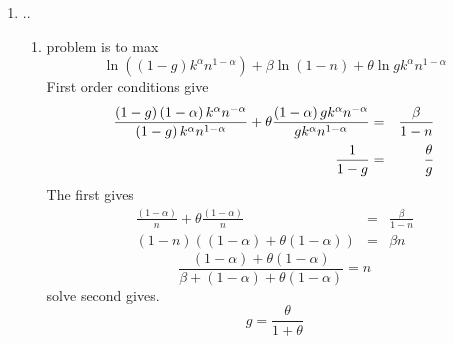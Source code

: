 \documentclass{article}
\begin{document}
\begin{enumerate}
\begin{enumerate}
\begin{enumerate}
\item Use market clearing conditions to find\ 
\begin{equation*}
\frac{\left( 1-\alpha \right) \left( \frac{k}{n}\right) ^{\alpha }}{%
k^{\alpha }n^{1-\alpha }-G}=\frac{\beta }{1-n}
\end{equation*}%
but $G=gy$ so we get 
\begin{equation*}
\frac{\left( 1-\alpha \right) k_{0}^{\alpha }n^{-\alpha }}{\left( 1-g\right)
k_{0}^{\alpha }n^{1-\alpha }}=\frac{\beta }{1-n}
\end{equation*}%
and simplifying gives 
\begin{equation*}
\frac{\left( 1-\alpha \right) }{\left( 1-g\right) n}=\frac{\beta }{1-n}
\end{equation*}%
or 
\begin{equation*}
\frac{\left( 1-\alpha \right) }{1+\beta \left( 1-g\right) -\alpha }=n
\end{equation*}
\end{enumerate}

\item ..

\begin{enumerate}
\item problem is to max%
\begin{equation*}
\ln (\left( 1-g\right) k^{\alpha }n^{1-\alpha })+\beta \ln \left( 1-n\right)
+\theta \ln gk^{\alpha }n^{1-\alpha }
\end{equation*}%
First order conditions give 
\begin{eqnarray*}
\frac{\left( 1-g\right) \left( 1-\alpha \right) k^{\alpha }n^{-\alpha }}{%
\left( 1-g\right) k^{\alpha }n^{1-\alpha }}+\theta \frac{\left( 1-\alpha
\right) gk^{\alpha }n^{-\alpha }}{gk^{\alpha }n^{1-\alpha }} &=&\frac{\beta 
}{1-n} \\
\frac{1}{1-g} &=&\frac{\theta }{g}
\end{eqnarray*}%
The first gives%
\begin{eqnarray*}
\frac{\left( 1-\alpha \right) }{n}+\theta \frac{\left( 1-\alpha \right) }{n}
&=&\frac{\beta }{1-n} \\
\left( 1-n\right) \left( \left( 1-\alpha \right) +\theta \left( 1-\alpha
\right) \right) &=&\beta n
\end{eqnarray*}%
\begin{equation*}
\frac{\left( 1-\alpha \right) +\theta \left( 1-\alpha \right) }{\beta
+\left( 1-\alpha \right) +\theta \left( 1-\alpha \right) }=n
\end{equation*}%
solve second gives$.$ 
\begin{equation*}
g=\frac{\theta }{1+\theta }
\end{equation*}
\end{enumerate}
\end{enumerate}


\end{enumerate}
\end{document}
